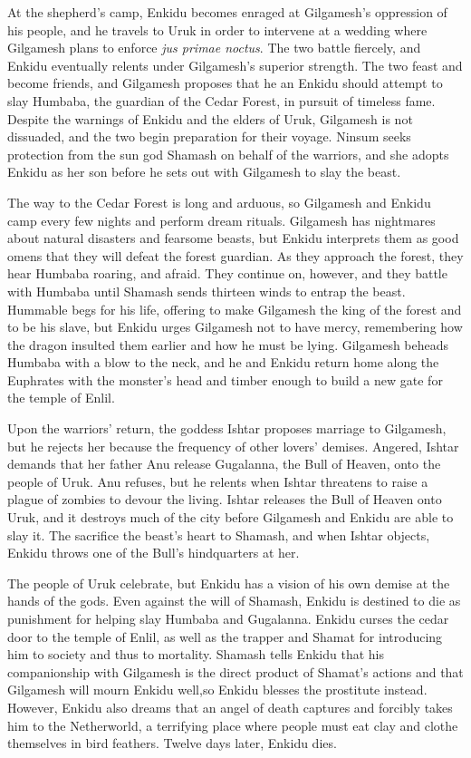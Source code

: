 \documentclass[10pt,a4paper]{article}
\begin{document}
At the shepherd’s camp, Enkidu becomes enraged at Gilgamesh’s oppression of his people, and he travels to Uruk in order to intervene at a wedding where Gilgamesh plans to enforce \emph{jus primae noctus}. The two battle fiercely, and Enkidu eventually relents under Gilgamesh’s superior strength. The two feast and become friends, and Gilgamesh proposes that he an Enkidu should attempt to slay Humbaba, the guardian of the Cedar Forest, in pursuit of timeless fame. Despite the warnings of Enkidu and the elders of Uruk, Gilgamesh is not dissuaded, and the two begin preparation for their voyage. Ninsum seeks protection from the sun god Shamash on behalf of the warriors, and she adopts Enkidu as her son before he sets out with Gilgamesh to slay the beast.

The way to the Cedar Forest is long and arduous, so Gilgamesh and Enkidu camp every few nights and perform dream rituals. Gilgamesh has nightmares about natural disasters and fearsome beasts, but Enkidu interprets them as good omens that they will defeat the forest guardian. As they approach the forest, they hear Humbaba roaring, and afraid. They continue on, however, and they battle with Humbaba until Shamash sends thirteen winds to entrap the beast. Hummable begs for his life, offering to make Gilgamesh the king of the forest and to be his slave, but Enkidu urges Gilgamesh not to have mercy, remembering how the dragon insulted them earlier and how he must be lying. Gilgamesh beheads Humbaba with a blow to the neck, and he and Enkidu return home along the Euphrates with the monster's head and timber enough to build a new gate for the temple of Enlil. 

Upon the warriors’ return, the goddess Ishtar proposes marriage to Gilgamesh, but he rejects her because the frequency of other lovers’ demises. Angered, Ishtar demands that her father Anu release Gugalanna, the Bull of Heaven, onto the people of Uruk. Anu refuses, but he relents when Ishtar threatens to raise a plague of zombies to devour the living. Ishtar releases the Bull of Heaven onto Uruk, and it destroys much of the city before Gilgamesh and Enkidu are able to slay it. The sacrifice the beast’s heart to Shamash, and when Ishtar objects, Enkidu throws one of the Bull’s hindquarters at her. 

The people of Uruk celebrate, but Enkidu has a vision of his own demise at the hands of the gods. Even against the will of Shamash, Enkidu is destined to die as punishment for helping slay Humbaba and Gugalanna. Enkidu curses the cedar door to the temple of Enlil, as well as the trapper and Shamat for introducing him to society and thus to mortality. Shamash tells Enkidu that his companionship with Gilgamesh is the direct product of Shamat’s actions and that Gilgamesh will mourn Enkidu well,so Enkidu blesses the prostitute instead. However, Enkidu also dreams that an angel of death captures and forcibly takes him to the Netherworld, a terrifying place where people must eat clay and clothe themselves in bird feathers. Twelve days later, Enkidu dies.
\end{document}
